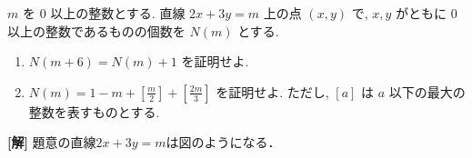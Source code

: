 \documentclass[a4paper,10pt]{ltjsarticle}
\begin{document}
\begin{oframed}
  $m$ を $0$ 以上の整数とする. 直線 $2x+3y=m$ 上の点 $(x,y)$ で, $x, y$ がともに $0$ 以上の整数であるものの個数を $N(m)$ とする.
  \begin{enumerate}
    \item $N(m+6)=N(m)+1$ を証明せよ.
    \item $N(m)=1-m+\left[\frac{m}{2}\right]+\left[\frac{2m}{3}\right]$ を証明せよ. ただし, $[a]$ は $a$ 以下の最大の整数を表すものとする.
  \end{enumerate}
\end{oframed}


\setlength{\columnseprule}{0.4pt}
\begin{multicols}{2}
  {\bf[解]}
  題意の直線$2x+3y=m$は図のようになる．

  \begin{figure}[H]
    \centering
  \end{figure}


\end{multicols}
\end{document}
